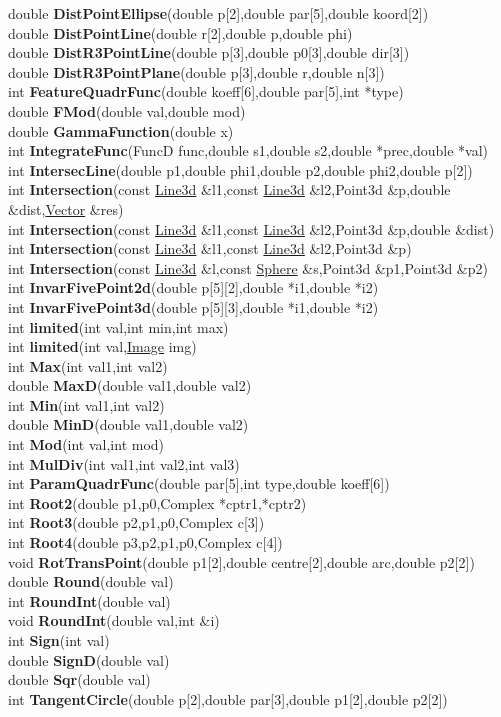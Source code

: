 \documentclass[10pt,titlepage]{article}
\def\functionlistentry#1#2#3#4#5#6{\noindent #1 {\bf #2}(#3) \dotfill #6\\}
\begin{document}
{{\functionlistentry{double}{DistPointEllipse}{double p[2],double par[5],double koord[2]}{1376}{numeric}{}
\functionlistentry{double}{DistPointLine}{double r[2],double p,double phi}{1373}{numeric}{}
\functionlistentry{double}{DistR3PointLine}{double p[3],double p0[3],double dir[3]}{1394}{numeric}{}
\functionlistentry{double}{DistR3PointPlane}{double p[3],double r,double n[3]}{1395}{numeric}{}
\functionlistentry{int}{FeatureQuadrFunc}{double koeff[6],double par[5],int *type}{1381}{numeric}{}
\functionlistentry{double}{FMod}{double val,double mod}{1358}{numeric}{}
\functionlistentry{double}{GammaFunction}{double x}{1362}{numeric}{}
\functionlistentry{int}{IntegrateFunc}{FuncD func,double s1,double s2,double *prec,double *val}{1402}{numeric}{}
\functionlistentry{int}{IntersecLine}{double p1,double phi1,double p2,double phi2,double p[2]}{1377}{numeric}{}
\functionlistentry{int}{Intersection}{const \hyperlink{Line3d}{Line3d} \&l1,const \hyperlink{Line3d}{Line3d} \&l2,Point3d \&p,double \&dist,\hyperlink{Vector}{Vector} \&res}{1388}{numeric}{}
\functionlistentry{int}{Intersection}{const \hyperlink{Line3d}{Line3d} \&l1,const \hyperlink{Line3d}{Line3d} \&l2,Point3d \&p,double \&dist}{1389}{numeric}{}
\functionlistentry{int}{Intersection}{const \hyperlink{Line3d}{Line3d} \&l1,const \hyperlink{Line3d}{Line3d} \&l2,Point3d \&p}{1390}{numeric}{}
\functionlistentry{int}{Intersection}{const \hyperlink{Line3d}{Line3d} \&l,const \hyperlink{Sphere}{Sphere} \&s,Point3d \&p1,Point3d \&p2}{1391}{numeric}{}
\functionlistentry{int}{InvarFivePoint2d}{double p[5][2],double *i1,double *i2}{1383}{numeric}{}
\functionlistentry{int}{InvarFivePoint3d}{double p[5][3],double *i1,double *i2}{1392}{numeric}{}
\functionlistentry{int}{limited}{int val,int min,int max}{1343}{numeric}{}
\functionlistentry{int}{limited}{int val,\hyperlink{Image}{Image} img}{1344}{numeric}{}
\functionlistentry{int}{Max}{int val1,int val2}{1352}{numeric}{}
\functionlistentry{double}{MaxD}{double val1,double val2}{1354}{numeric}{}
\functionlistentry{int}{Min}{int val1,int val2}{1353}{numeric}{}
\functionlistentry{double}{MinD}{double val1,double val2}{1355}{numeric}{}
\functionlistentry{int}{Mod}{int val,int mod}{1357}{numeric}{}
\functionlistentry{int}{MulDiv}{int val1,int val2,int val3}{1356}{numeric}{}
\functionlistentry{int}{ParamQuadrFunc}{double par[5],int type,double koeff[6]}{1382}{numeric}{}
\functionlistentry{int}{Root2}{double p1,p0,Complex *cptr1,*cptr2}{1396}{numeric}{}
\functionlistentry{int}{Root3}{double p2,p1,p0,Complex c[3]}{1397}{numeric}{}
\functionlistentry{int}{Root4}{double p3,p2,p1,p0,Complex c[4]}{1398}{numeric}{}
\functionlistentry{void}{RotTransPoint}{double p1[2],double centre[2],double arc,double p2[2]}{1372}{numeric}{}
\functionlistentry{double}{Round}{double val}{1359}{numeric}{}
\functionlistentry{int}{RoundInt}{double val}{1360}{numeric}{}
\functionlistentry{void}{RoundInt}{double val,int \&i}{1361}{numeric}{}
\functionlistentry{int}{Sign}{int val}{1350}{numeric}{}
\functionlistentry{double}{SignD}{double val}{1351}{numeric}{}
\functionlistentry{double}{Sqr}{double val}{1345}{numeric}{}
\functionlistentry{int}{TangentCircle}{double p[2],double par[3],double p1[2],double p2[2]}{1378}{numeric}{}

}}
\end{document}
